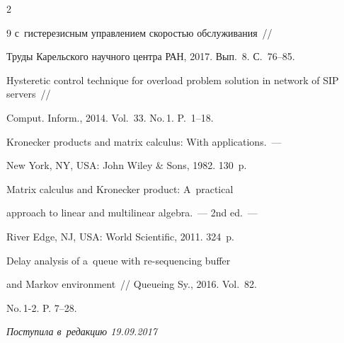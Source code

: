 \begin{multicols}{2}
{{\begin{thebibliography}{9}
с~гистерезисным управлением скоростью обслуживания~//


Труды Карельского научного центра РАН, 2017. Вып.~8. С.~76--85.









Hysteretic control technique for overload problem solution in network of SIP servers~//


Comput. Inform., 2014. Vol.~33. No.\,1. P.~1--18.





















Kronecker products and matrix calculus: With applications.~--- 


New York, NY, USA: John Wiley \& Sons, 1982. 130~p.









Matrix calculus and Kronecker product: A~practical


approach to linear and multilinear algebra.~--- 2nd ed.~---


River Edge, NJ, USA: World Scientific, 2011. 324~p.









Delay analysis of a~queue with re-sequencing buffer


and Markov environment~// Queueing Sy., 2016. Vol.~82. 


No.\,1-2. P. 7--28.





\end{thebibliography}


} }





\end{multicols}





 \label{end\stat}





 \vspace*{-3pt}





\hfill{\small\textit{Поступила в~редакцию  19.09.2017}}




\renewcommand{\figurename}{\protect\bf Рис.}


\renewcommand{\tablename}{\protect\bf Таблица} 


